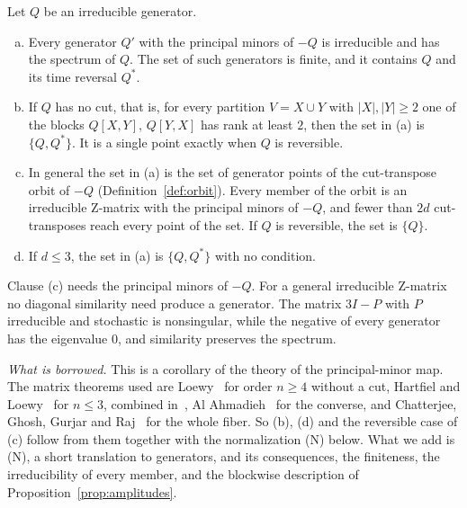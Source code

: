\begin{corollary}\label{thm:nonreversible}
Let $Q$ be an irreducible generator.
\begin{enumerate}[(a)]
\item Every generator $Q'$ with the principal minors of $-Q$ is irreducible and has the
spectrum of $Q$. The set of such generators is finite, and it contains $Q$ and its time
reversal $Q^*$.
\item If $Q$ has no cut, that is, for every partition $V=X\cup Y$ with $|X|,|Y|\ge2$ one of
the blocks $Q[X,Y]$, $Q[Y,X]$ has rank at least $2$, then the set in \textup{(a)} is
$\{Q,Q^*\}$. It is a single point exactly when $Q$ is reversible.
\item In general the set in \textup{(a)} is the set of generator points of the
cut-transpose orbit of $-Q$ (Definition~\ref{def:orbit}). Every member of the orbit is an
irreducible Z-matrix with the principal minors of $-Q$, and fewer than $2d$ cut-transposes
reach every point of the set. If $Q$ is reversible, the set is $\{Q\}$.
\item If $d\le3$, the set in \textup{(a)} is $\{Q,Q^*\}$ with no condition.
\end{enumerate}
\end{corollary}

Clause (c) needs the principal minors of $-Q$. For a general irreducible Z-matrix no
diagonal similarity need produce a generator. The matrix $3I-P$ with $P$ irreducible and
stochastic is nonsingular, while the negative of every generator has the eigenvalue $0$,
and similarity preserves the spectrum.

\emph{What is borrowed.} This is a corollary of the theory of the principal-minor map. The
matrix theorems used are Loewy~\cite[Theorem~1]{loewy1986}
for order $n\ge4$ without a cut, Hartfiel and Loewy~\cite[Theorem~3]{hartfielloewy1984} for
$n\le3$, combined in~\cite[Lemma~2.8]{cggr2024}, Al Ahmadieh~\cite[Theorem~4.1 and
Lemma~4.5]{alahmadieh2023} for the converse, and Chatterjee, Ghosh, Gurjar and
Raj~\cite[Theorem~1.1]{cggr2024} for the whole fiber. So (b), (d) and the reversible case of
(c) follow from them together with the normalization (N) below. What we add is (N), a short
translation to generators, and its consequences, the finiteness, the irreducibility of every
member, and the blockwise description of Proposition~\ref{prop:amplitudes}.

